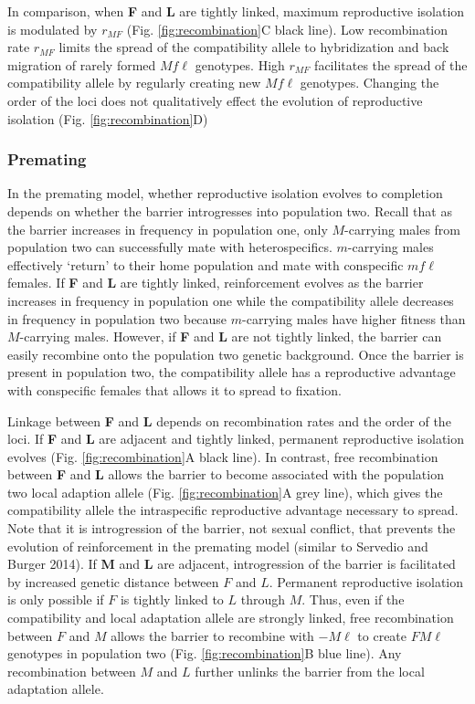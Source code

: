 \documentclass[11pt]{article}
\begin{document}
In comparison, when \textbf{F} and \textbf{L} are tightly linked, maximum reproductive isolation is modulated by $r_{MF}$ (Fig. \ref{fig:recombination}C black line). Low recombination rate $r_{MF}$ limits the spread of the compatibility allele to hybridization and back migration of rarely formed $Mf\ell$ genotypes. High $r_{MF}$ facilitates the spread of the compatibility allele by regularly creating new $Mf\ell$ genotypes. Changing the order of the loci does not qualitatively effect the evolution of reproductive isolation (Fig. \ref{fig:recombination}D)

\subsubsection*{Premating}

In the premating model, whether reproductive isolation evolves to completion depends on whether the barrier introgresses into population two. Recall that as the barrier increases in frequency in population one, only $M$-carrying males from population two can successfully mate with heterospecifics.  $m$-carrying males effectively `return' to their home population and mate with conspecific $mf\ell$ females. If \textbf{F} and \textbf{L} are tightly linked, reinforcement evolves as the barrier increases in frequency in population one while the compatibility allele decreases in frequency in population two because $m$-carrying males have higher fitness than $M$-carrying males. However, if \textbf{F} and \textbf{L} are not tightly linked, the barrier can easily recombine onto the population two genetic background. Once the barrier is present in population two, the compatibility allele has a reproductive advantage with conspecific females that allows it to spread to fixation. 

Linkage between \textbf{F} and \textbf{L} depends on recombination rates and the order of the loci. If \textbf{F} and \textbf{L} are adjacent and tightly linked, permanent reproductive isolation evolves (Fig. \ref{fig:recombination}A black line). In contrast, free recombination between \textbf{F} and \textbf{L} allows the barrier to become associated with the population two local adaption allele (Fig. \ref{fig:recombination}A grey line), which gives the compatibility allele the intraspecific reproductive advantage necessary to spread. Note that it is introgression of the barrier, not sexual conflict, that prevents the evolution of reinforcement in the premating model (similar to Servedio and Burger 2014).  If \textbf{M} and \textbf{L} are adjacent, introgression of the barrier is facilitated by increased genetic distance between $F$ and $L$. Permanent reproductive isolation is only possible if $F$ is tightly linked to $L$ through $M$. Thus, even if the compatibility and local adaptation allele are strongly linked, free recombination between $F$ and $M$ allows the barrier to recombine with $-M\ell$ to create $FM\ell$ genotypes in population two (Fig. \ref{fig:recombination}B blue line). Any recombination between $M$ and $L$ further unlinks the barrier from the local adaptation allele.
\end{document}
